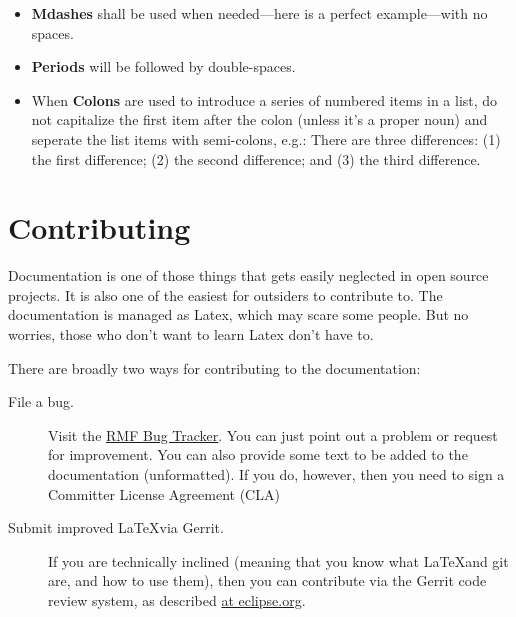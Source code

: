 \begin{itemize}

\item
  \textbf{Mdashes} shall be used when needed—here is a perfect example—with no spaces.  
\item
  \textbf{Periods} will be followed by double-spaces.
\item
  When \textbf{Colons} are used to introduce a series of numbered items in a list, do not capitalize the first item after the colon (unless it's a proper noun) and seperate the list items with semi-colons, e.g.:
  There are three differences: (1) the first difference; (2) the second difference; and (3) the third difference.
  
\end{itemize}

\section{Contributing}

Documentation is one of those things that gets easily neglected in open source projects.  It is also one of the easiest for outsiders to contribute to.  The documentation is managed as Latex, which may scare some people.  But no worries, those who don't want to learn Latex don't have to.

There are broadly two ways for contributing to the documentation:

\begin{description}
  \item[File a bug.]  Visit the \href{https://bugs.eclipse.org/bugs/enter_bug.cgi?assigned_to=&blocked=&bug_severity=normal&bug_status=NEW&comment=&contenttypeentry=&contenttypemethod=autodetect&data=&dependson=&description=&flag_type-1=X&flag_type-11=X&flag_type-12=X&flag_type-2=X&flag_type-4=X&flag_type-6=X&flag_type-7=X&flag_type-8=X&form_name=enter_bug&keywords=&&op_sys=All&product=MDT.RMF&qa_contact=&rep_platform=All&short_desc=&version=unspecified}{RMF Bug Tracker}.  You can just point out a problem or request for improvement.  You can also provide some text to be added to the documentation (unformatted).  If you do, however, then you need to sign a Committer License Agreement (CLA)
  \item[Submit improved \LaTeX via Gerrit.]  If you are technically inclined (meaning that you know what \LaTeX and git are, and how to use them), then you can contribute via the Gerrit code review system, as described \href{https://wiki.eclipse.org/Gerrit}{at eclipse.org}.
\end{description}

